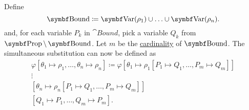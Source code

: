 \begin{definition}
\begin{defenum}
    Define
    \begin{equation*}
      \cat{Bound} \coloneqq \bfop{Var}(\rho_1) \cup \ldots \cup \bfop{Var}(\rho_n).
    \end{equation*}
    and, for each variable \( P_k \) in \( \cat{Bound} \), pick a variable \( Q_k \) from \( \bfop{Prop} \setminus \bfop{Bound} \). Let \( m \) be the \hyperref[def:cardinal]{cardinality} of \( \bfop{Bound} \). The simultaneous substitution can now be defined as
    \begin{align*}
      \varphi[\theta_1 \mapsto \rho_1, \ldots, \theta_n \mapsto \rho_n] \coloneqq \varphi
      [\theta_1 \mapsto \rho_1[P_1 \mapsto Q_1, \ldots, P_m \mapsto Q_m]] \\
      \vdots \hspace{3cm} \\
      [\theta_n \mapsto \rho_n[P_1 \mapsto Q_1, \ldots, P_m \mapsto Q_m]] \\
      [Q_1 \mapsto P_1, \ldots, Q_m \mapsto P_m].
    \end{align*}
  \end{defenum}
\end{definition}

